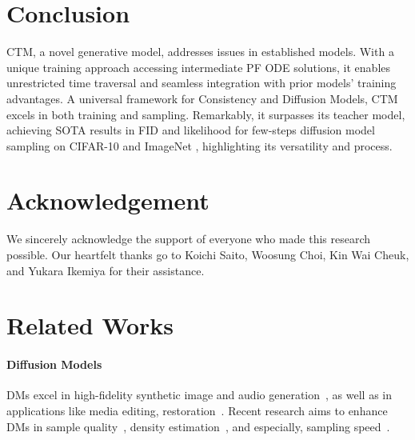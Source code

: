 \documentclass{article} \usepackage{iclr2024_coNFErence,times}
\theoremstyle{definition}
\theoremstyle{remark}
\begin{document}
\section{Conclusion}

CTM, a novel generative model, addresses issues in established models. With a unique training approach accessing intermediate PF ODE solutions, it enables unrestricted time traversal and seamless integration with prior models' training advantages. A universal framework for Consistency and Diffusion Models, CTM excels in both training and sampling. Remarkably, it surpasses its teacher model, achieving SOTA results in FID and likelihood for few-steps diffusion model sampling on CIFAR-10 and ImageNet , highlighting its versatility and process.



\section*{Acknowledgement}
We sincerely acknowledge the support of everyone who made this research possible. Our heartfelt thanks go to Koichi Saito, Woosung Choi, Kin Wai Cheuk, and Yukara Ikemiya for their assistance. 


\clearpage
\newpage











\clearpage
\newpage
\appendix

\tableofcontents
	\newpage
	\parttoc

\section{Related Works}\label{sec:related_work}
\paragraph{Diffusion Models} DMs excel in high-fidelity synthetic image and audio generation~\citep{dhariwal2021diffusion,saharia2022photorealistic,rombach2022high}, as well as in applications like media editing, restoration~\citep{meng2021sdedit,cheuk2023diffroll,kawar2022denoising,saito2023unsupervised,hernandez2023vrdmg,murata2023gibbsddrm}. Recent research aims to enhance DMs in sample quality~\citep{kim2022maximum,kim2022refining}, density estimation~\citep{song2021maximum,lu2022maximum}, and especially, sampling speed~\citep{song2020denoising}. 
\end{document}
